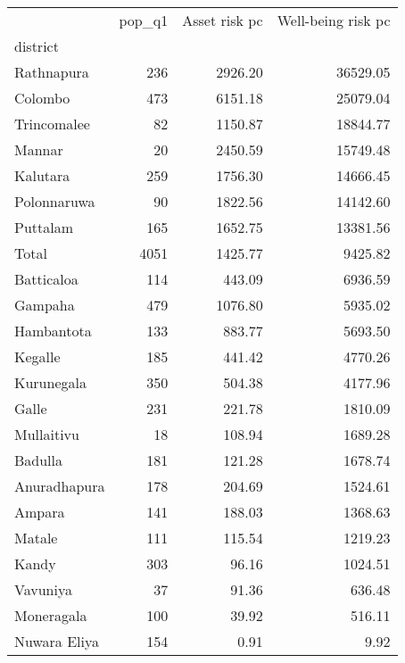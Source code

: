 \begin{tabular}{lrrr}
\toprule
{} &  pop\_q1 &  Asset risk pc &  Well-being risk pc \\
district     &         &                &                     \\
\midrule
Rathnapura   &     236 &        2926.20 &            36529.05 \\
Colombo      &     473 &        6151.18 &            25079.04 \\
Trincomalee  &      82 &        1150.87 &            18844.77 \\
Mannar       &      20 &        2450.59 &            15749.48 \\
Kalutara     &     259 &        1756.30 &            14666.45 \\
Polonnaruwa  &      90 &        1822.56 &            14142.60 \\
Puttalam     &     165 &        1652.75 &            13381.56 \\
Total        &    4051 &        1425.77 &             9425.82 \\
Batticaloa   &     114 &         443.09 &             6936.59 \\
Gampaha      &     479 &        1076.80 &             5935.02 \\
Hambantota   &     133 &         883.77 &             5693.50 \\
Kegalle      &     185 &         441.42 &             4770.26 \\
Kurunegala   &     350 &         504.38 &             4177.96 \\
Galle        &     231 &         221.78 &             1810.09 \\
Mullaitivu   &      18 &         108.94 &             1689.28 \\
Badulla      &     181 &         121.28 &             1678.74 \\
Anuradhapura &     178 &         204.69 &             1524.61 \\
Ampara       &     141 &         188.03 &             1368.63 \\
Matale       &     111 &         115.54 &             1219.23 \\
Kandy        &     303 &          96.16 &             1024.51 \\
Vavuniya     &      37 &          91.36 &              636.48 \\
Moneragala   &     100 &          39.92 &              516.11 \\
Nuwara Eliya &     154 &           0.91 &                9.92 \\
\bottomrule
\end{tabular}
